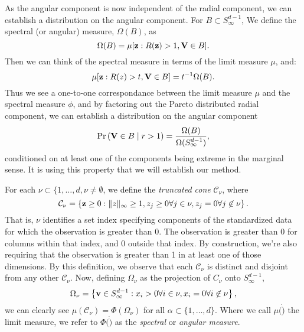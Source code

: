 As the angular component is now independent of the radial component, we can
  establish a distribution on the angular component.  For
  $B\subset S_{\infty}^{d-1}$, We define the spectral (or angular) measure,
  $\Omega(B)$, as
\begin{equation}
  \Omega(B) = \mu[{\bf z}: R({\bf z}) > 1, {\bf V} \in B].
\end{equation}
Then we can think of the spectral measure in terms of the limit measure $\mu$,
  and:
\begin{equation}
  \mu[{\bf z}:R(z)>t, {\bf V}\in B] = t^{-1}\Omega(B).
\end{equation}
Thus we see a one-to-one correspondance between the limit measure $\mu$ and the
  spectral measure $\phi$, and by factoring out the Pareto distributed radial
  component, we can establish a distribution on the angular component
\begin{equation}
  \text{Pr}\left({\bf V} \in B \mid r > 1\right) = \frac{\Omega(B)}{\Omega(S_{\infty}^{d-1})},
\end{equation}
conditioned on at least one of the components being extreme in the marginal
  sense.  It is using this property that we will establish our method.

For each $\nu\subset\lbrace{1,\ldots,d}, \nu \neq \emptyset$, we define the
  \emph{truncated cone} $\mathcal{C}_{\nu}$, where
\begin{equation}
    \mathcal{C}_{\nu} = \left\lbrace {\bf z} \geq 0 : \lVert z\rVert_{\infty}\geq 1, z_j \geq 0 \forall j \in \nu, z_j = 0 \forall j \not\in \nu\right\rbrace.
\end{equation}
That is, $\nu$ identifies a set index specifying components of the standardized
  data for which the observation is greater than 0.  The observation is greater
  than 0 for columns within that index, and 0 outside that index.  By
  construction, we're also requiring that the observation is greater than 1 in
  at least one of those dimensions.  By this definition, we observe that each
  $\mathcal{C}_{\nu}$ is distinct and disjoint from any other
  $\mathcal{C}_{\nu}$.  Now, defining $\Omega_{\nu}$ as the projection of
  $C_{\nu}$ onto $S_{\infty}^{d-1}$,
\begin{equation}
    \Omega_{\nu} = \left\lbrace {\bf v} \in S_{\infty}^{d-1} : x_i > 0 \forall i \in \nu, x_i = 0 \forall i \not\in \nu\right\rbrace,
\end{equation}
we can clearly see $\mu(\mathcal{C}_\nu) = \Phi(\Omega_{\nu})$ for all
  $\alpha \subset\lbrace1,\ldots,d\rbrace$.  Where we call $\mu(\dot)$ the limit
  measure, we refer to $\Phi(\dot)$ as the \emph{spectral} or
  \emph{angular measure}.

